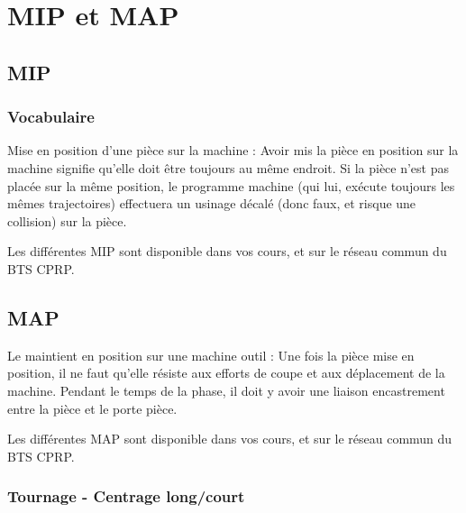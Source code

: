 \documentclass[
	11pt, %
	fleqn, %
	a4paper, %
]{LegrandOrangeBook}
\begin{document}

\chapterspaceabove{6.25cm} %
\chapterspacebelow{7.5cm} %


\chapter{MIP et MAP}
\section{MIP}
\subsection{Vocabulaire}
\begin{definition}
Mise en position d'une pièce sur la machine : Avoir mis la pièce en position sur la machine signifie qu'elle doit être toujours au même endroit. Si la pièce n'est pas placée sur la même position, le programme machine (qui lui, exécute toujours les mêmes trajectoires) effectuera un usinage décalé (donc faux, et risque une collision) sur la pièce.
\end{definition}

Les différentes MIP sont disponible dans vos cours, et sur le réseau commun du BTS CPRP.

\section{MAP}
\begin{definition}
    Le maintient en position sur une machine outil : Une fois la pièce mise en position, il ne faut qu'elle résiste aux efforts de coupe et aux déplacement de la machine. Pendant le temps de la phase, il doit y avoir une liaison encastrement entre la pièce et le porte pièce.
\end{definition}

Les différentes MAP sont disponible dans vos cours, et sur le réseau commun du BTS CPRP.

\subsection{Tournage - Centrage long/court}
\end{document}

